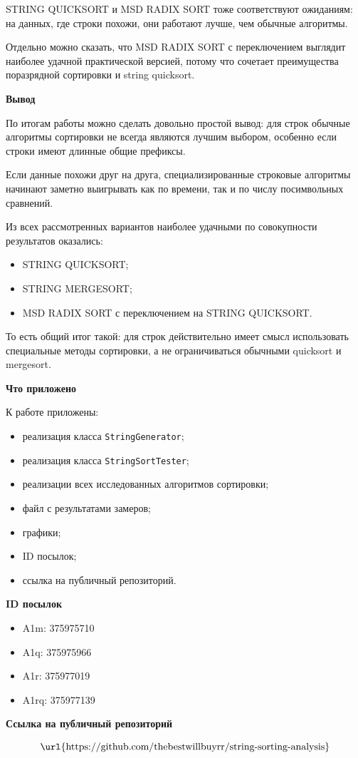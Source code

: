 \documentclass[12pt,a4paper]{article}
\begin{document}
STRING QUICKSORT и MSD RADIX SORT тоже соответствуют ожиданиям: на данных, где строки похожи, они работают лучше, чем обычные алгоритмы.

Отдельно можно сказать, что MSD RADIX SORT с переключением выглядит наиболее удачной практической версией, потому что сочетает преимущества поразрядной сортировки и string quicksort.

\bigskip

\textbf{Вывод}

По итогам работы можно сделать довольно простой вывод:  
для строк обычные алгоритмы сортировки не всегда являются лучшим выбором, особенно если строки имеют длинные общие префиксы.

Если данные похожи друг на друга, специализированные строковые алгоритмы начинают заметно выигрывать как по времени, так и по числу посимвольных сравнений.

Из всех рассмотренных вариантов наиболее удачными по совокупности результатов оказались:
\begin{itemize}
    \item STRING QUICKSORT;
    \item STRING MERGESORT;
    \item MSD RADIX SORT с переключением на STRING QUICKSORT.
\end{itemize}

То есть общий итог такой: для строк действительно имеет смысл использовать специальные методы сортировки, а не ограничиваться обычными quicksort и mergesort.

\bigskip

\textbf{Что приложено}

К работе приложены:
\begin{itemize}
    \item реализация класса \texttt{StringGenerator};
    \item реализация класса \texttt{StringSortTester};
    \item реализации всех исследованных алгоритмов сортировки;
    \item файл с результатами замеров;
    \item графики;
    \item ID посылок;
    \item ссылка на публичный репозиторий.
\end{itemize}

\bigskip

\textbf{ID посылок}

\begin{itemize}
    \item A1m: 375975710
    \item A1q: 375975966
    \item A1r: 375977019
    \item A1rq: 375977139
\end{itemize}

\bigskip

\textbf{Ссылка на публичный репозиторий}

\[
\text{\url{https://github.com/thebestwillbuyrr/string-sorting-analysis}}
\]
\end{document}
